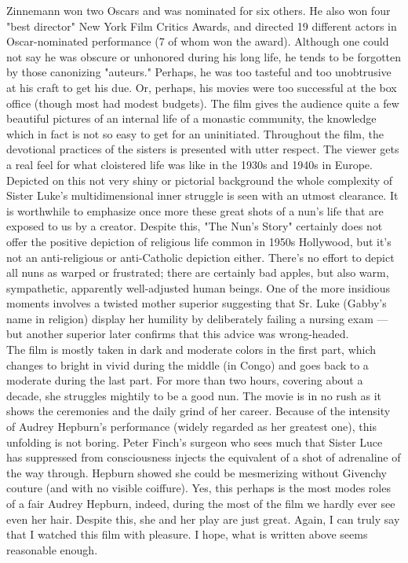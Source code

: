 \documentclass[8pt]{article} %
\begin{document}
Zinnemann won two Oscars and was nominated for six others. He also won four "best director" New York Film Critics Awards, and directed 19 different actors in Oscar-nominated performance (7 of whom won the award). Although one could not say he was obscure or unhonored during his long life, he tends to be forgotten by those canonizing "auteurs." Perhaps, he was too tasteful and too unobtrusive at his craft to get his due. Or, perhaps, his movies were too successful at the box office (though most had modest budgets). 
The film gives the audience quite a few beautiful pictures of an internal life of a monastic community, the knowledge which in fact is not so easy to get for an 
uninitiated. Throughout the film, the devotional practices of the sisters is presented with utter respect. The viewer gets a real feel for what cloistered life was like in the 1930s and 1940s in Europe. Depicted on this not very
shiny or pictorial background the whole complexity of Sister Luke's multidimensional inner struggle is seen with an utmost clearance. It is worthwhile to emphasize once more these great shots of a nun's life that are exposed to us
by a creator. Despite this, "The Nun’s Story" certainly does not offer the positive depiction of religious life common in 1950s Hollywood, but it’s not an anti-religious or anti-Catholic depiction either.
There’s no effort to depict all nuns as warped or frustrated; there are certainly bad apples, but also warm, sympathetic, apparently well-adjusted human beings. 
One of the more insidious moments involves a twisted mother superior suggesting that Sr. Luke (Gabby’s name in religion) display her humility by deliberately failing a nursing exam — but another superior later
confirms that this advice was wrong-headed.\\
The film is mostly taken in dark and moderate colors in the first part, which changes to bright in vivid during the middle (in Congo) and goes back to a moderate during the last part. For more than two hours, covering about a decade, she struggles mightily to be a good nun. The movie is in no rush as it shows the ceremonies and the daily grind of her career. Because of the intensity of Audrey Hepburn's performance (widely regarded as her greatest one), this unfolding is not boring. Peter Finch's surgeon who sees much that Sister Luce has suppressed from consciousness injects the equivalent of a shot of adrenaline of the way through. Hepburn showed she could be mesmerizing without Givenchy couture (and with no visible coiffure). Yes, this perhaps is the most modes roles of a fair Audrey Hepburn, indeed, during the most of the film we hardly ever see even her hair. Despite this, she and her play are just great. Again, 
I can truly say that I watched this film with pleasure. I hope, what is written above seems reasonable enough.\\
\end{document}
